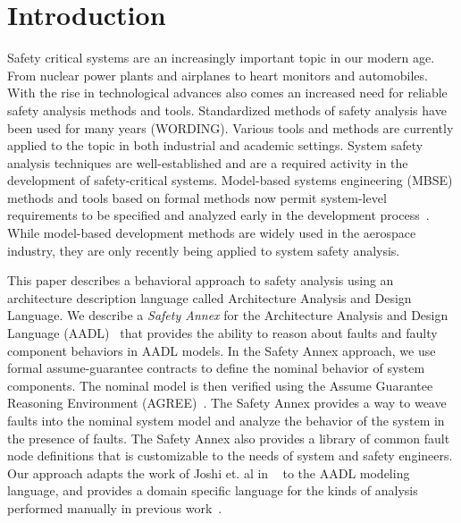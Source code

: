 \section{Introduction}
\label{sec:intro}
Safety critical systems are an increasingly important topic in our modern age. From nuclear power plants and airplanes to heart monitors and automobiles. With the rise in technological advances also comes an increased need for reliable safety analysis methods and tools. Standardized methods of safety analysis have been used for many years (WORDING). Various tools and methods are currently applied to the topic in both industrial and academic settings. System safety analysis techniques are well-established and are a required activity in the development of safety-critical systems. Model-based systems engineering (MBSE) methods and tools based on formal methods now permit system-level requirements to be specified and analyzed early in the development process~\cite{NFM2012:CoGaMiWhLaLu,CAV2015:BoCiGrMa}. While model-based development methods are widely used in the aerospace industry, they are only recently being applied to system safety analysis.  

This paper describes a behavioral approach to safety analysis using an architecture description language called Architecture Analysis and Design Language. We describe a {\em Safety Annex} for the Architecture Analysis and Design Language (AADL)~\cite{FeilerModelBasedEngineering2012} that provides the ability to reason about faults and faulty component behaviors in AADL models. In the Safety Annex approach, we use formal assume-guarantee contracts to define the nominal behavior of system components. The nominal model is then verified using the Assume Guarantee Reasoning Environment (AGREE)~\cite{NFM2012:CoGaMiWhLaLu}. The Safety Annex  provides a way to weave faults into the nominal system model and analyze the behavior of the system in the presence of faults. The Safety Annex also provides a library of common fault node definitions that is customizable to the needs of system and safety engineers. Our approach adapts the work of Joshi et. al in
~\cite{Joshi05:Dasc} to the AADL modeling language, and provides a domain specific language for the kinds of analysis performed manually in previous work~\cite{Stewart17:IMBSA}. 



